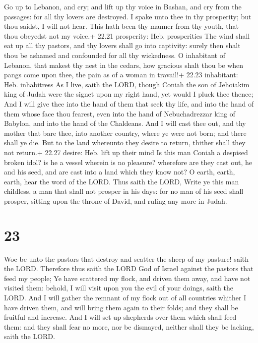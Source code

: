  Go up to Lebanon, and cry; and lift up thy voice in
Bashan, and cry from the passages: for all thy lovers are destroyed.
 I spake unto thee in thy prosperity; but thou saidst, I
will not hear. This hath been thy manner from thy youth, that thou
obeyedst not my voice.+ 22.21 prosperity: Heb. prosperities
 The wind shall eat up all thy pastors, and thy lovers
shall go into captivity: surely then shalt thou be ashamed and
confounded for all thy wickedness.  O inhabitant of
Lebanon, that makest thy nest in the cedars, how gracious shalt thou be
when pangs come upon thee, the pain as of a woman in travail!+ 22.23
inhabitant: Heb. inhabitress  As I live, saith the LORD,
though Coniah the son of Jehoiakim king of Judah were the signet upon my
right hand, yet would I pluck thee thence;  And I will give
thee into the hand of them that seek thy life, and into the hand of them
whose face thou fearest, even into the hand of Nebuchadrezzar king of
Babylon, and into the hand of the Chaldeans.  And I will
cast thee out, and thy mother that bare thee, into another country,
where ye were not born; and there shall ye die.  But to the
land whereunto they desire to return, thither shall they not return.+
22.27 desire: Heb. lift up their mind  Is this man Coniah a
despised broken idol? is he a vessel wherein is no pleasure? wherefore
are they cast out, he and his seed, and are cast into a land which they
know not?  O earth, earth, earth, hear the word of the
LORD.  Thus saith the LORD, Write ye this man childless, a
man that shall not prosper in his days: for no man of his seed shall
prosper, sitting upon the throne of David, and ruling any more in Judah.

\hypertarget{section-22}{%
\section{23}\label{section-22}}

 Woe be unto the pastors that destroy and scatter the sheep
of my pasture! saith the LORD.  Therefore thus saith the
LORD God of Israel against the pastors that feed my people; Ye have
scattered my flock, and driven them away, and have not visited them:
behold, I will visit upon you the evil of your doings, saith the LORD.
 And I will gather the remnant of my flock out of all
countries whither I have driven them, and will bring them again to their
folds; and they shall be fruitful and increase.  And I will
set up shepherds over them which shall feed them: and they shall fear no
more, nor be dismayed, neither shall they be lacking, saith the LORD.

